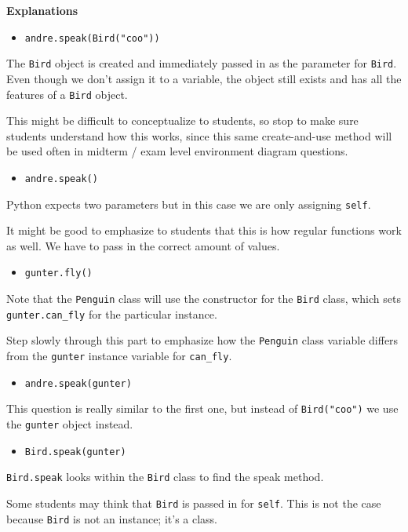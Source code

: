 \begin{solution}[-32pt]
\begin{blocksection}
\textbf{Explanations}

\begin{itemize}
    \item \lstinline{andre.speak(Bird("coo"))}
\end{itemize}
The \lstinline{Bird} object is created and immediately passed in as the parameter for \lstinline{Bird}. Even though we don't assign it to a variable, the object still exists and has all the features of a \lstinline{Bird} object.
\begin{guide}
This might be difficult to conceptualize to students, so stop to make sure students understand how this works, since this same create-and-use method will be used often in midterm / exam level environment diagram questions.
\end{guide}

\begin{itemize}
    \item \lstinline{andre.speak()}
\end{itemize}
Python expects two parameters but in this case we are only assigning \lstinline{self}.
\begin{guide}
It might be good to emphasize to students that this is how regular functions work as well. We have to pass in the correct amount of values.
\end{guide}

\begin{itemize}
    \item \lstinline{gunter.fly()}
\end{itemize}
Note that the \lstinline{Penguin} class will use the constructor for the \lstinline{Bird} class, which sets \lstinline{gunter.can_fly} for the particular instance.
\begin{guide}
Step slowly through this part to emphasize how the \lstinline{Penguin} class variable differs from the \lstinline{gunter} instance variable for \lstinline{can_fly}.
\end{guide}

\begin{itemize}
    \item \lstinline{andre.speak(gunter)}
\end{itemize}
This question is really similar to the first one, but instead of \lstinline{Bird("coo")} we use the \lstinline{gunter} object instead.

\begin{itemize}
    \item \lstinline{Bird.speak(gunter)}
\end{itemize}
\lstinline{Bird.speak} looks within the \lstinline{Bird} class to find the speak method. 
\begin{guide}
    Some students may think that \lstinline{Bird} is passed in for \lstinline{self}. This is not the case because \lstinline{Bird} is not an instance; it’s a class.
\end{guide}

\end{blocksection}
\end{solution}
